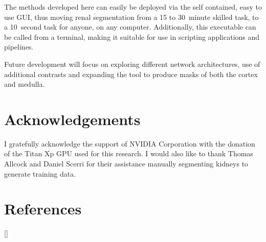 The methods developed here can easily be deployed via the self contained, easy to use \ac{GUI}, thus moving renal segmentation from a 15 to 30~minute skilled task, to a 10~second task for anyone, on any computer. Additionally, this executable can be called from a terminal, making it suitable for use in scripting applications and pipelines.

Future development will focus on exploring different network architectures, use of additional contrasts and expanding the tool to produce masks of both the cortex and medulla.

\section{Acknowledgements}

I gratefully acknowledge the support of NVIDIA Corporation with the donation of the Titan Xp GPU used for this research. I would also like to thank Thomas Allcock and Daniel Scerri for their assistance manually segmenting kidneys to generate training data.

\newpage
\section{References}
[\refname]{}
\printbibliography